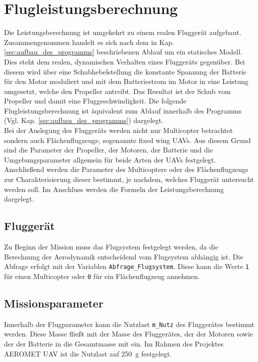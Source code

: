\section{Flugleistungsberechnung}
\label{sec:flugleistungsberechnung}
Die Leistungsberechnung ist umgekehrt zu einem realen Fluggerät aufgebaut.  Zusammengenommen handelt es sich nach dem in Kap. \ref{sec:aufbau_des_programms} beschriebenen Ablauf um ein statisches Modell. Dies steht dem realen, dynamischen Verhalten eines Fluggeräts gegenüber. Bei diesem wird über eine Schubhebelstellung die konstante Spannung der Batterie für den Motor moduliert und mit dem Batteriestrom im Motor in eine Leistung umgesetzt, welche den Propeller antreibt. Das Resultat ist der Schub vom Propeller und damit eine Fluggeschwindigkeit.
Die folgende Flugleistungsberechnung ist äquivalent zum Ablauf innerhalb des Programms (Vgl. Kap. \ref{sec:aufbau_des_programms}) dargelegt. \\

Bei der Auslegung des Fluggeräts werden nicht nur Multicopter betrachtet sondern auch Flächenflugzeuge, sogenannte fixed wing UAVs. Aus diesem Grund sind die Parameter der Propeller, der Motoren, der Batterie und die Umgebungsparameter allgemein für beide Arten der UAVs festgelegt. Anschließend werden die Parameter des Multicopters oder des Flächenflugzeugs zur Charakterisierung dieser bestimmt, je nachdem, welches Fluggerät untersucht werden soll. Im Anschluss werden die Formeln der Leistungsberechnung dargelegt. 

 
\subsection{Fluggerät}
\label{subsec:fluggerät}
Zu Beginn der Mission muss das Flugsystem festgelegt werden, da die Berechnung der Aerodynamik entscheidend vom Flugsystem abhängig ist. Die Abfrage erfolgt mit der Variablen \texttt{Abfrage\_Flugsystem}. Diese kann die Werte \texttt{1} für einen Multicopter oder \texttt{0} für ein Flächenflugzeug annehmen.


\subsection{Missionsparameter}
Innerhalb der Flugparameter kann die Nutzlast \texttt{m\_Nutz} des Fluggerätes bestimmt werden. Diese Masse fließt mit der Masse des Fluggerätes, der der Motoren sowie der der Batterie in die Gesamtmasse mit ein. Im Rahmen des Projektes AEROMET UAV ist die Nutzlast auf \SI{250}{g} festgelegt.


